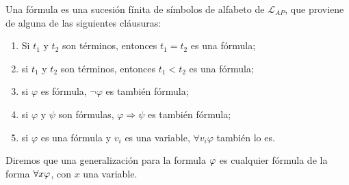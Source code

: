 \begin{defn}
    Una fórmula es una sucesión fínita de símbolos de alfabeto de $\mathcal{L}_{AP}$, que proviene de alguna de las siguientes cláusuras:
    \begin{enumerate}
        \item Si $t_1$ y $t_2$ son términos, entonces $t_1=t_2$ es una fórmula;
        \item si $t_1$ y $t_2$ son términos, entonces $t_1<t_2$ es una fórmula;
        \item si $\varphi$ es fórmula, $\neg\varphi$ es también fórmula;
        \item si $\varphi$ y $\psi$  son fórmulas, $\varphi\Longrightarrow\psi$ es también fórmula;
        \item si $\varphi$ es una fórmula y $v_i$ es una variable, $\forall v_i\varphi$ también lo es.
    \end{enumerate}
\end{defn}

\begin{defn}
    Diremos que una generalización para la formula $\varphi$ es cualquier fórmula de la forma $\forall x\varphi$, con $x$ una variable.
\end{defn}

